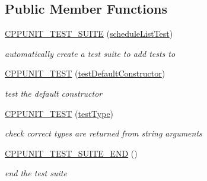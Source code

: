 \subsection*{Public Member Functions}
\begin{DoxyCompactItemize}
\item 
\mbox{\label{classscheduleListTest_a072cf6a160cc6694ac384345165c4f0b}} 
\mbox{\hyperlink{classscheduleListTest_a072cf6a160cc6694ac384345165c4f0b}{C\+P\+P\+U\+N\+I\+T\+\_\+\+T\+E\+S\+T\+\_\+\+S\+U\+I\+TE}} (\mbox{\hyperlink{classscheduleListTest}{schedule\+List\+Test}})
\begin{DoxyCompactList}\small\item\em automatically create a test suite to add tests to \end{DoxyCompactList}\item 
\mbox{\label{classscheduleListTest_abaa94007bd8e605dc3741c3c216f9c27}} 
\mbox{\hyperlink{classscheduleListTest_abaa94007bd8e605dc3741c3c216f9c27}{C\+P\+P\+U\+N\+I\+T\+\_\+\+T\+E\+ST}} (\mbox{\hyperlink{classscheduleListTest_a8495411fca3065150fb4ab98b4d950eb}{test\+Default\+Constructor}})
\begin{DoxyCompactList}\small\item\em test the default constructor \end{DoxyCompactList}\item 
\mbox{\label{classscheduleListTest_a6291991f154c56d50fee42dfb5809d7d}} 
\mbox{\hyperlink{classscheduleListTest_a6291991f154c56d50fee42dfb5809d7d}{C\+P\+P\+U\+N\+I\+T\+\_\+\+T\+E\+ST}} (\mbox{\hyperlink{classscheduleListTest_a420ec9f4f0d97230ebe2911d5be4a856}{test\+Type}})
\begin{DoxyCompactList}\small\item\em check correct types are returned from string arguments \end{DoxyCompactList}\item 
\mbox{\label{classscheduleListTest_a161be3834e2145e52cae28a5cb79d45c}} 
\mbox{\hyperlink{classscheduleListTest_a161be3834e2145e52cae28a5cb79d45c}{C\+P\+P\+U\+N\+I\+T\+\_\+\+T\+E\+S\+T\+\_\+\+S\+U\+I\+T\+E\+\_\+\+E\+ND}} ()
\begin{DoxyCompactList}\small\item\em end the test suite \end{DoxyCompactList}\item 

\end{DoxyCompactItemize}
